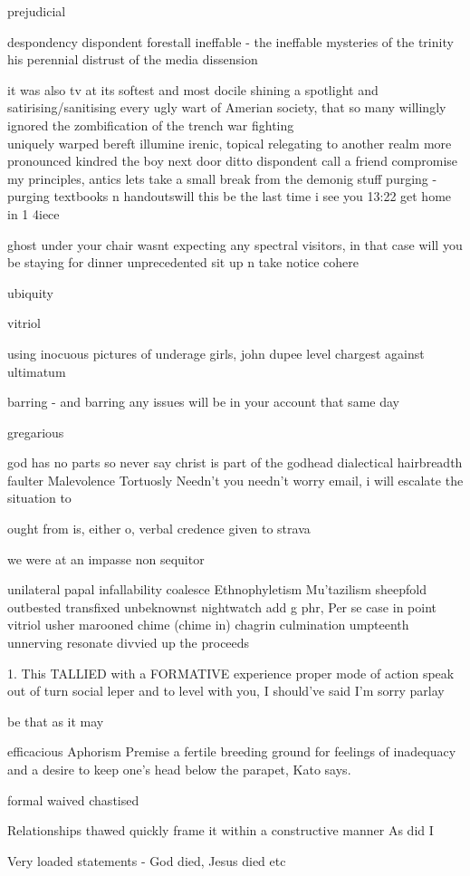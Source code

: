 
prejudicial



despondency
dispondent
forestall
ineffable - the ineffable mysteries of the trinity
his perennial distrust of the media
dissension

it was also tv at its softest and most docile
shining a spotlight and satirising/sanitising every ugly wart of Amerian society, that so many willingly ignored
the zombification of the
trench war fighting\\
uniquely warped
bereft illumine irenic, topical relegating to another realm
more pronounced
kindred
the boy next door
ditto
dispondent
call a friend
compromise my principles, antics
lets take a small break from the demonig stuff
purging - purging textbooks n handoutswill this be the last time i see you
13:22
get home in 1 4iece


ghost under your chair
wasnt expecting any spectral visitors, in that case will you be staying for dinner
unprecedented
sit up n take notice
cohere

ubiquity

vitriol

using inocuous pictures of underage girls, john dupee
level chargest against
ultimatum

barring - and barring any issues will be in your account that same day

gregarious

god has no parts so never say christ is part of the godhead
dialectical
hairbreadth
faulter
Malevolence
Tortuosly
Needn't you needn't worry
email, i will escalate the situation to

ought from is, either o, verbal credence given to
strava

we were at an impasse
non sequitor

unilateral papal infallability
coalesce
Ethnophyletism
Mu'tazilism
sheepfold
outbested
transfixed
unbeknownst
nightwatch
add g phr,
Per se
case in point
vitriol
usher
marooned
chime (chime in)
chagrin
culmination
umpteenth
unnerving
resonate
divvied up the proceeds

1. This TALLIED with a FORMATIVE experience
proper mode of action
speak out of turn
social leper
and to level with you, I should've said I'm sorry
parlay

be that as it may

efficacious
Aphorism
Premise
 a fertile breeding ground for feelings of inadequacy and a desire to keep one’s head below the parapet, Kato says.

formal
waived
chastised

Relationships thawed
quickly frame it within a constructive manner
As did I

Very loaded statements - God died, Jesus died etc

